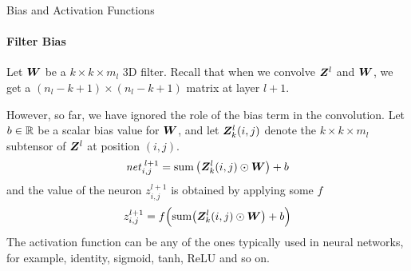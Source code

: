 %
%
%
%
%
\begin{frame}{Bias and Activation Functions}
	\framesubtitle{Filter Bias}
Let ${\boldsymbol W}$ be a $k \times k \times m_l$ 3D filter.
Recall that when we convolve ${\boldsymbol Z}^l$ and ${\boldsymbol W}$, we get a $(n_l-k+1)
\times (n_l-k+1)$ matrix at layer $l+1$. 

\medskip

However, so far, we have ignored the role of the bias term in the
convolution. Let $b \in {\mathord{\mathbb R}}$ be a scalar bias value for ${\boldsymbol W}$, and
let ${\boldsymbol Z}^l_k(i,j)$ denote the $k \times k \times m_l$ subtensor of
${\boldsymbol Z}^l$ at position $(i,j)$.
\begin{align*}
    \mathit{net}^{\;l+1}_{i,j} = \operatorname*{sum}\left( {\boldsymbol Z}^l_k(i,j) \odot {\boldsymbol W} \right) +
    b
\end{align*}
and the value of the neuron $z^{l+1}_{i,j}$ is obtained by applying some
$f$%
\begin{align*}
    z^{l+1}_{i,j} = f\Bigl(\operatorname*{sum}\bigl( {\boldsymbol Z}^l_k(i,j) \odot {\boldsymbol W} \bigr) +
        b \Bigr)
\end{align*}
The activation function can be any of the ones typically used in neural
networks, for example, identity, sigmoid, tanh, ReLU and so on.
%
\end{frame}
